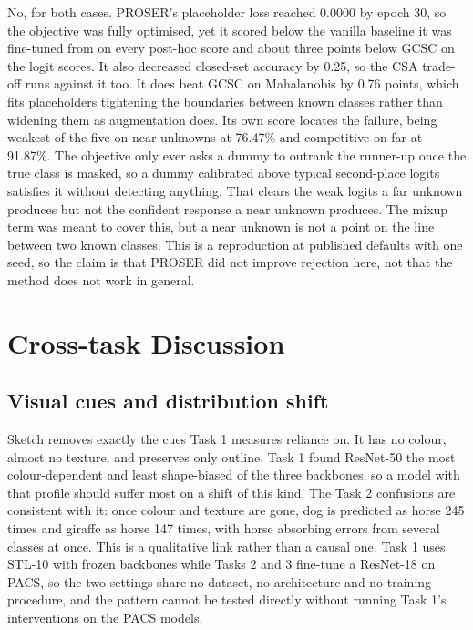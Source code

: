 \documentclass{article}
\begin{document}
No, for both cases. PROSER's placeholder loss reached 0.0000 by epoch 30, so
the objective was fully optimised, yet it scored below the vanilla baseline
it was fine-tuned from on every post-hoc score and about three points below
GCSC on the logit scores. It also decreased closed-set accuracy by 0.25, so
the CSA trade-off runs against it too. It does beat GCSC on Mahalanobis by
0.76 points, which fits placeholders tightening the boundaries between known
classes rather than widening them as augmentation does. Its own score locates
the failure, being weakest of the five on near unknowns at 76.47\% and
competitive on far at 91.87\%. The objective only ever asks a dummy to
outrank the runner-up once the true class is masked, so a dummy calibrated
above typical second-place logits satisfies it without detecting anything.
That clears the weak logits a far unknown produces but not the confident
response a near unknown produces. The mixup term was meant to cover this, but
a near unknown is not a point on the line between two known classes. This is
a reproduction at published defaults with one seed, so the claim is that
PROSER did not improve rejection here, not that the method does not work in
general.

\section{Cross-task Discussion}
\label{sec:cross}

\subsection{Visual cues and distribution shift}

Sketch removes exactly the cues Task 1 measures reliance on. It has no
colour, almost no texture, and preserves only outline. Task 1 found ResNet-50
the most colour-dependent and least shape-biased of the three backbones, so a
model with that profile should suffer most on a shift of this kind. The Task
2 confusions are consistent with it: once colour and texture are gone, dog is
predicted as horse 245 times and giraffe as horse 147 times, with horse
absorbing errors from several classes at once. This is a qualitative link
rather than a causal one. Task 1 uses STL-10 with frozen backbones while
Tasks 2 and 3 fine-tune a ResNet-18 on PACS, so the two settings share no
dataset, no architecture and no training procedure, and the pattern cannot be
tested directly without running Task 1's interventions on the PACS models.
\end{document}
